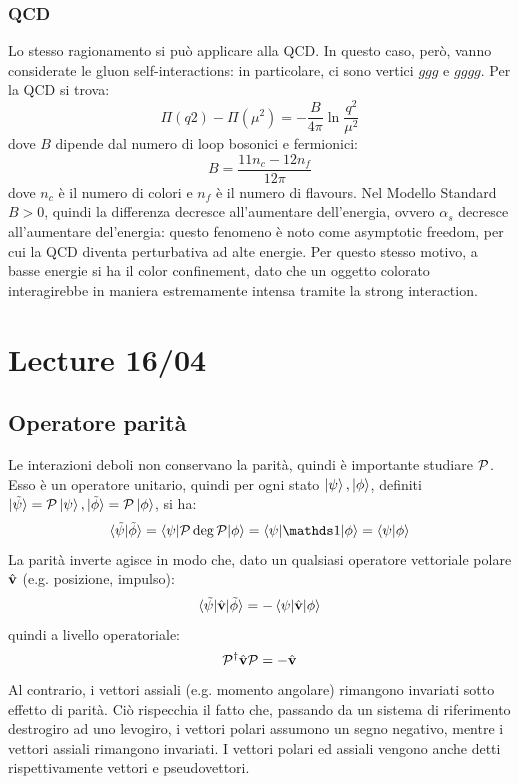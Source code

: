 \subsection{QCD}

Lo stesso ragionamento si può applicare alla QCD. In questo caso, però, vanno considerate le gluon self-interactions: in particolare, ci sono vertici $ ggg $ e $ gggg $. Per la QCD si trova:
\begin{equation*}
  \Pi(q2) - \Pi(\mu^2) = - \frac{B}{4\pi} \ln \frac{q^2}{\mu^2}
\end{equation*}
dove $ B $ dipende dal numero di loop bosonici e fermionici:
\begin{equation*}
  B = \frac{11 n_c - 12 n_f}{12 \pi}
\end{equation*}
dove $ n_c $ è il numero di colori e $ n_f $ è il numero di flavours. Nel Modello Standard $ B > 0 $, quindi la differenza decresce all'aumentare dell'energia, ovvero $ \alpha_s $ decresce all'aumentare del'energia: questo fenomeno è noto come asymptotic freedom, per cui la QCD diventa perturbativa ad alte energie. Per questo stesso motivo, a basse energie si ha il color confinement, dato che un oggetto colorato interagirebbe in maniera estremamente intensa tramite la strong interaction.

\chapter{Lecture 16/04}

\section{Operatore parità}

Le interazioni deboli non conservano la parità, quindi è importante studiare $ \mathcal{P} $. Esso è un operatore unitario, quindi per ogni stato $ \ket{\psi} , \ket{\phi} $, definiti $ \ket{\tilde{\psi}} = \mathcal{P} \ket{\psi} , \ket{\tilde{\phi}} = \mathcal{P} \ket{\phi} $, si ha:
\begin{equation*}
  \braket{\tilde{\psi} | \tilde{\phi}} = \braket{\psi | \oppar\deg \oppar | \phi} = \braket{\psi | \id | \phi} = \braket{\psi | \phi}
\end{equation*}
La parità inverte agisce in modo che, dato un qualsiasi operatore vettoriale polare $ \hat{\mathbf{v}} $ (e.g. posizione, impulso):
\begin{equation*}
  \braket{\tilde{\psi} | \hat{\mathbf{v}} | \tilde{\phi}} = - \braket{\psi | \hat{\mathbf{v}} | \phi}
\end{equation*}
quindi a livello operatoriale:
\begin{equation}
  \mathcal{P}^\dagger \hat{\mathbf{v}} \mathcal{P} = - \hat{\mathbf{v}}
\end{equation}
Al contrario, i vettori assiali (e.g. momento angolare) rimangono invariati sotto effetto di parità. Ciò rispecchia il fatto che, passando da un sistema di riferimento destrogiro ad uno levogiro, i vettori polari assumono un segno negativo, mentre i vettori assiali rimangono invariati. I vettori polari ed assiali vengono anche detti rispettivamente vettori e pseudovettori.

